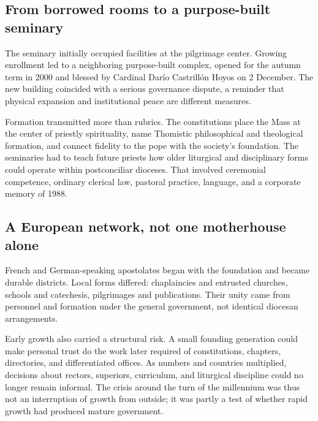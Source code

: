 \subsection{From borrowed rooms to a purpose-built seminary}

The seminary initially occupied facilities at the pilgrimage center. Growing enrollment led to a neighboring purpose-built complex, opened for the autumn term in 2000 and blessed by Cardinal Darío Castrillón Hoyos on 2 December. The new building coincided with a serious governance dispute, a reminder that physical expansion and institutional peace are different measures.

Formation transmitted more than rubrics. The constitutions place the Mass at the center of priestly spirituality, name Thomistic philosophical and theological formation, and connect fidelity to the pope with the society's foundation. The seminaries had to teach future priests how older liturgical and disciplinary forms could operate within postconciliar dioceses. That involved ceremonial competence, ordinary clerical law, pastoral practice, language, and a corporate memory of 1988.

\subsection{A European network, not one motherhouse alone}

French and German-speaking apostolates began with the foundation and became durable districts. Local forms differed: chaplaincies and entrusted churches, schools and catechesis, pilgrimages and publications. Their unity came from personnel and formation under the general government, not identical diocesan arrangements.

Early growth also carried a structural risk. A small founding generation could make personal trust do the work later required of constitutions, chapters, directories, and differentiated offices. As numbers and countries multiplied, decisions about rectors, superiors, curriculum, and liturgical discipline could no longer remain informal. The crisis around the turn of the millennium was thus not an interruption of growth from outside; it was partly a test of whether rapid growth had produced mature government.

